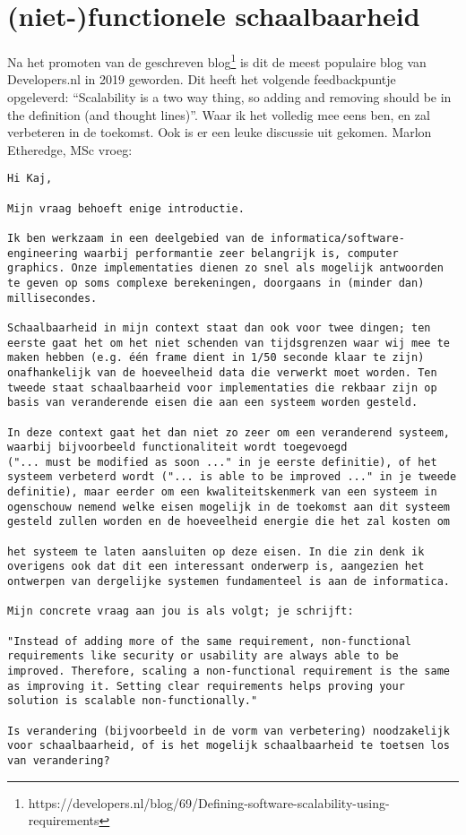 \section{(niet-)functionele schaalbaarheid}

\label{feedbackschaalbaarheid}

Na het promoten van de geschreven blog\footnote{https://developers.nl/blog/69/Defining-software-scalability-using-requirements} is dit de meest populaire blog van Developers.nl in 2019 geworden. Dit heeft het volgende feedbackpuntje opgeleverd: \enquote{Scalability is a two way thing, so adding and removing should be in the definition (and thought lines)}. Waar ik het volledig mee eens ben, en zal verbeteren in de toekomst. Ook is er een leuke discussie uit gekomen. Marlon Etheredge, MSc vroeg:
\begin{verbatim}
Hi Kaj,

Mijn vraag behoeft enige introductie.

Ik ben werkzaam in een deelgebied van de informatica/software-engineering waarbij performantie zeer belangrijk is, computer graphics. Onze implementaties dienen zo snel als mogelijk antwoorden te geven op soms complexe berekeningen, doorgaans in (minder dan) millisecondes.

Schaalbaarheid in mijn context staat dan ook voor twee dingen; ten eerste gaat het om het niet schenden van tijdsgrenzen waar wij mee te maken hebben (e.g. één frame dient in 1/50 seconde klaar te zijn) onafhankelijk van de hoeveelheid data die verwerkt moet worden. Ten tweede staat schaalbaarheid voor implementaties die rekbaar zijn op basis van veranderende eisen die aan een systeem worden gesteld.

In deze context gaat het dan niet zo zeer om een veranderend systeem, waarbij bijvoorbeeld functionaliteit wordt toegevoegd
("... must be modified as soon ..." in je eerste definitie), of het systeem verbeterd wordt ("... is able to be improved ..." in je tweede definitie), maar eerder om een kwaliteitskenmerk van een systeem in ogenschouw nemend welke eisen mogelijk in de toekomst aan dit systeem gesteld zullen worden en de hoeveelheid energie die het zal kosten om 

het systeem te laten aansluiten op deze eisen. In die zin denk ik overigens ook dat dit een interessant onderwerp is, aangezien het ontwerpen van dergelijke systemen fundamenteel is aan de informatica.

Mijn concrete vraag aan jou is als volgt; je schrijft:

"Instead of adding more of the same requirement, non-functional requirements like security or usability are always able to be improved. Therefore, scaling a non-functional requirement is the same as improving it. Setting clear requirements helps proving your solution is scalable non-functionally."

Is verandering (bijvoorbeeld in de vorm van verbetering) noodzakelijk voor schaalbaarheid, of is het mogelijk schaalbaarheid te toetsen los van verandering?
\end{verbatim}

